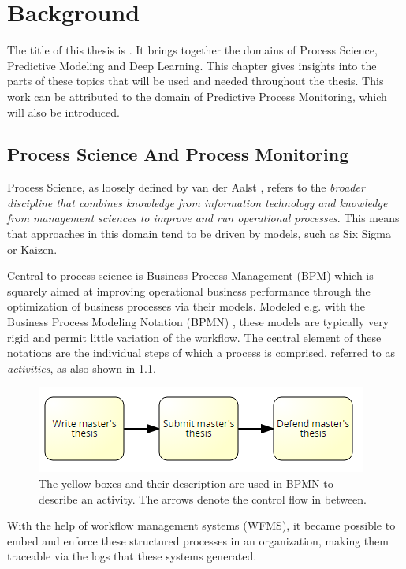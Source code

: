 \chapter{Background}\label{chap:background}
The title of this thesis is \textit{\thesisTitle}.
It brings together the domains of Process Science, Predictive Modeling and Deep Learning.
This chapter gives insights into the parts of these topics that will be used and needed throughout the thesis.
This work can be attributed to the domain of Predictive Process Monitoring, which will also be introduced.

\section{Process Science And Process Monitoring}
Process Science, as loosely defined by van der Aalst \cite{Aalst2016}, refers to the \textit{broader discipline that combines knowledge from information technology and knowledge from management sciences to improve and run operational processes}. This means that approaches in this domain tend to be driven by models, such as Six Sigma or Kaizen.

Central to process science is Business Process Management (BPM) which is squarely aimed at improving operational business performance through the optimization of business processes via their models.
Modeled e.g. with the Business Process Modeling Notation (BPMN) \cite{bpmn2.0}, these models are typically very rigid and permit little variation of the workflow. The central element of these notations are the individual steps of which a process is comprised, referred to as \textit{activities}, as also shown in \ref{fig:activity-introduction}.

\begin{figure}
    \centering
    \includegraphics[width=.75\textwidth]{gfx/activity-introduction.png}
    \caption{The yellow boxes and their description are used in BPMN to describe an activity. The arrows denote the control flow in between.}
    \label{fig:activity-introduction}
\end{figure}

With the help of workflow management systems (WFMS), it became possible to embed and enforce these structured processes in an organization, making them traceable via the logs that these systems generated. 

